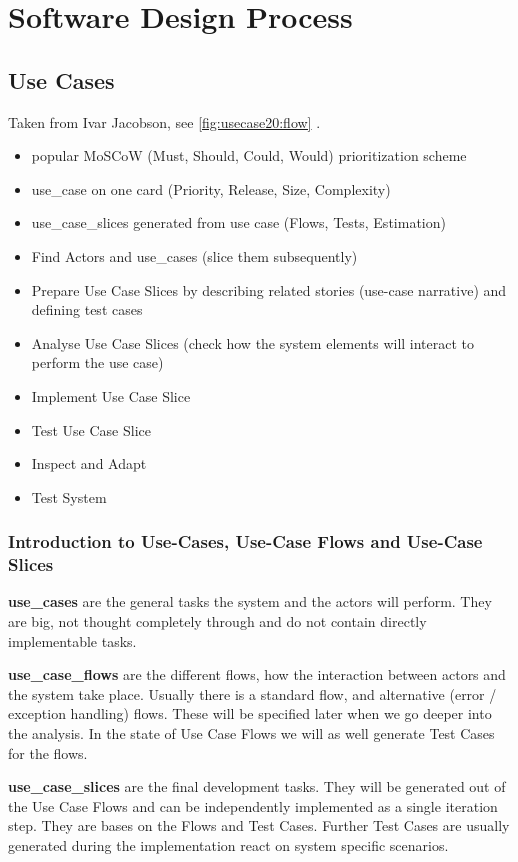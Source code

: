 {\color{gray}
\section{Software Design Process}
\label{sec:design}
\subsection{Use Cases}
Taken from Ivar Jacobson, see \autoref{fig:usecase20:flow} \cite{jacobson2011usecase}.
\begin{itemize}
	\item popular MoSCoW (Must, Should, Could, Would) prioritization scheme
	\item \gls{use_case} on one card (Priority, Release, Size, Complexity)
	\item \glspl{use_case_slice} generated from use case (Flows, Tests, Estimation)
	\item Find Actors and \glspl{use_case} (slice them subsequently)
	\item Prepare Use Case Slices by describing related stories (use-case narrative) and defining test cases
	\item Analyse Use Case Slices (check how the system elements will interact to perform the use case)
	\item Implement Use Case Slice
	\item Test Use Case Slice
	\item Inspect and Adapt
	\item Test System
\end{itemize}

\subsubsection{Introduction to Use-Cases, Use-Case Flows and Use-Case Slices}

\textbf{\glspl{use_case}} are the general tasks the system and the actors will perform. They are big, not thought completely through and do not contain directly implementable tasks.

\textbf{\glspl{use_case_flow}} are the different flows, how the interaction between actors and the system take place. Usually there is a standard flow, and alternative (error / exception handling) flows. These will be specified later when we go deeper into the analysis. In the state of Use Case Flows we will as well generate Test Cases for the flows. 

\textbf{\glspl{use_case_slice}} are the final development tasks. They will be generated out of the Use Case Flows and can be independently implemented as a single iteration step. They are bases on the Flows and Test Cases. Further Test Cases are usually generated during the implementation react on system specific scenarios.


}
